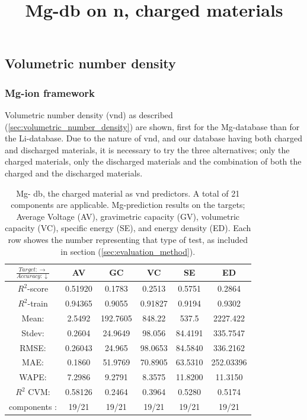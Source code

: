 \subsection{Volumetric number density}
\subsubsection*{Mg-ion framework}

Volumetric number density (vnd) as described (\ref{sec:volumetric_number_density}) are shown, first for the Mg-database than for the Li-database. Due to the nature of vnd, and our database having both charged and discharged materials, it is necessary to try the three alternatives; only the charged materials, only the discharged materials  and the combination of both the charged and the discharged materials.

\begin{table}[h]
\scriptsize
\centering
\caption{Mg- db, the charged material as vnd predictors. A total of 21 components are applicable. Mg-prediction results on the targets; Average Voltage (AV), gravimetric capacity (GV), volumetric capacity (VC), specific energy (SE), and energy density (ED). Each row showes the number representing that type of test, as included in section (\ref{sec:evaluation_method}). } 
\title{Mg-db on n, charged materials}
\begin{tabular}{|c|c|c|c|c|c|}
	\hline 
	$\frac{Target: \rightarrow}{Accuracy:\downarrow} $ & AV & GC & VC & SE & ED 
	 \\ 
	\hline
	$R^2$-score 	& 0.51920 & 0.1783 	& 0.2513 & 0.5751 &   0.2864\\ 
	\hline 
	$R^2$-train 	& 0.94365 & 0.9055 	& 0.91827 & 0.9194 & 0.9302 \\ 
	\hline
	Mean: 		& 2.5492 &192.7605	&848.22	&537.5&2227.422\\
	\hline 
	Stdev: 		& 0.2604 &24.9649	&98.056&84.4191&335.7547\\
	\hline		
	RMSE:		 & 0.26043& 24.965 &  98.0653 &  84.5840 &336.2162 \\ 
	\hline
	MAE: 		& 0.1860 & 51.9769& 70.8905 & 63.5310 & 252.03396 \\ 
	\hline
	WAPE:		& 7.2986 & 9.2791 & 8.3575  & 11.8200 & 11.3150 \\
	\hline
	$R^2$ CVM: 	& 0.58126 &  0.2464 & 0.3964  & 0.5280 &0.5174 \\
	\hline
	components :	& 19/21 & 19/21 & 19/21  & 19/21 &19/21 \\
	\hline
\end{tabular}
\label{tab:mg-n-i}
\end{table}


